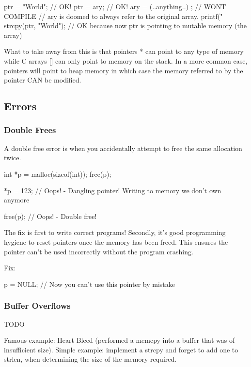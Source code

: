 \begin{code}[language=C]
ptr = "World"; // OK!
ptr = ary; // OK!
ary = (..anything..) ; // WONT COMPILE
// ary is doomed to always refer to the original array.
printf("%
strcpy(ptr, "World"); // OK because now ptr is pointing to mutable memory (the array)
\end{code}

What to take away from this is that pointers * can point to any type of memory while C arrays {[}{]} can only point to memory on the stack. In a more common case, pointers will point to heap memory in which case the memory referred to by the pointer CAN be modified.

\subsection{Errors}

\subsubsection{Double Frees}

A double free error is when you accidentally attempt to free the same allocation twice.

\begin{code}[language=C]
int *p = malloc(sizeof(int));
free(p);

*p = 123; // Oops! - Dangling pointer! Writing to memory we don't own anymore

free(p); // Oops! - Double free!
\end{code}

The fix is first to write correct programs! Secondly, it's good programming hygiene to reset pointers once the memory has been freed. This ensures the pointer can't be used incorrectly without the program crashing.

Fix:

\begin{code}[language=C]
p = NULL; // Now you can't use this pointer by mistake
\end{code}

\subsubsection{Buffer Overflows}

TODO

Famous example: Heart Bleed (performed a memcpy into a buffer that was of insufficient size). Simple example: implement a strcpy and forget to add one to strlen, when determining the size of the memory required.

